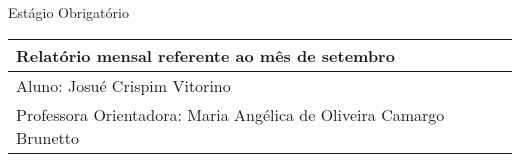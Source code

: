 

\begin{center}
Estágio Obrigatório 


\begin{tabular}{|l|l|}
\hline

Relatório mensal referente ao mês de setembro   \\ 

\hline
Aluno: Josué Crispim Vitorino \\ 
\hline
Professora Orientadora:  Maria Ang\'elica de Oliveira Camargo Brunetto \\ 
\hline
\end{tabular}\\


\end{center}
